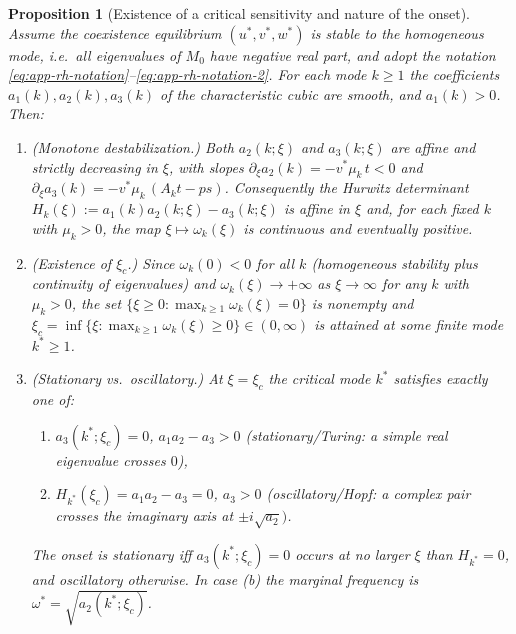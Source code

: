 \documentclass[a4paper,fleqn,longmktitle]{cas-sc}
\theoremstyle{plain}
\newtheorem{proposition}[theorem]{Proposition}
\theoremstyle{definition}
\numberwithin{equation}{section}
\begin{document}
\begin{proposition}[Existence of a critical sensitivity and nature of the onset]
\label{prop:xic-existence}
Assume the coexistence equilibrium $(u^*,v^*,w^*)$ is stable to the homogeneous
mode, i.e.\ all eigenvalues of $M_0$ have negative real part, and adopt the
notation \eqref{eq:app-rh-notation}--\eqref{eq:app-rh-notation-2}. For each mode
$k\ge1$ the coefficients $a_1(k),a_2(k),a_3(k)$ of the characteristic cubic are
smooth, and $a_1(k)>0$. Then:
\begin{enumerate}
\item[(i)] \emph{(Monotone destabilization.)} Both $a_2(k;\xi)$ and $a_3(k;\xi)$
are affine and strictly decreasing in $\xi$, with slopes
$\partial_\xi a_2(k)=-v^*\mu_k\,t<0$ and
$\partial_\xi a_3(k)=-v^*\mu_k\,(A_k t-ps)$. Consequently the Hurwitz
determinant $H_k(\xi):=a_1(k)a_2(k;\xi)-a_3(k;\xi)$ is affine in $\xi$ and, for
each fixed $k$ with $\mu_k>0$, the map $\xi\mapsto\omega_k(\xi)$ is continuous and
eventually positive.
\item[(ii)] \emph{(Existence of $\xi_c$.)} Since $\omega_k(0)<0$ for all $k$
(homogeneous stability plus continuity of eigenvalues) and
$\omega_{k}(\xi)\to+\infty$ as $\xi\to\infty$ for any $k$ with $\mu_k>0$, the set
$\{\xi\ge0:\max_{k\ge1}\omega_k(\xi)=0\}$ is nonempty and
$\xi_c=\inf\{\xi:\max_{k\ge1}\omega_k(\xi)\ge0\}\in(0,\infty)$ is attained at some
finite mode $k^*\ge1$.
\item[(iii)] \emph{(Stationary vs.\ oscillatory.)} At $\xi=\xi_c$ the critical
mode $k^*$ satisfies exactly one of:
\begin{enumerate}
\item[(a)] $a_3(k^*;\xi_c)=0$, $a_1a_2-a_3>0$ (stationary/Turing: a simple real eigenvalue crosses $0$),
\item[(b)] $H_{k^*}(\xi_c)=a_1a_2-a_3=0$, $a_3>0$ (oscillatory/Hopf: a complex pair crosses the imaginary axis at $\pm i\sqrt{a_2})$.
\end{enumerate}
The onset is stationary iff $a_3(k^*;\xi_c)=0$ occurs at no larger $\xi$ than
$H_{k^*}=0$, and oscillatory otherwise. In case (b) the marginal frequency is
$\omega^\ast=\sqrt{a_2(k^*;\xi_c)}$.
\end{enumerate}
\end{proposition}
\end{document}
